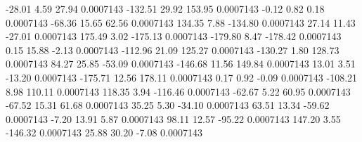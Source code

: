       -28.01        4.59       27.94     0.0007143
     -132.51       29.92      153.95     0.0007143
       -0.12        0.82        0.18     0.0007143
      -68.36       15.65       62.56     0.0007143
      134.35        7.88     -134.80     0.0007143
       27.14       11.43      -27.01     0.0007143
      175.49        3.02     -175.13     0.0007143
     -179.80        8.47     -178.42     0.0007143
        0.15       15.88       -2.13     0.0007143
     -112.96       21.09      125.27     0.0007143
     -130.27        1.80      128.73     0.0007143
       84.27       25.85      -53.09     0.0007143
     -146.68       11.56      149.84     0.0007143
       13.01        3.51      -13.20     0.0007143
     -175.71       12.56      178.11     0.0007143
        0.17        0.92       -0.09     0.0007143
     -108.21        8.98      110.11     0.0007143
      118.35        3.94     -116.46     0.0007143
      -62.67        5.22       60.95     0.0007143
      -67.52       15.31       61.68     0.0007143
       35.25        5.30      -34.10     0.0007143
       63.51       13.34      -59.62     0.0007143
       -7.20       13.91        5.87     0.0007143
       98.11       12.57      -95.22     0.0007143
      147.20        3.55     -146.32     0.0007143
       25.88       30.20       -7.08     0.0007143
